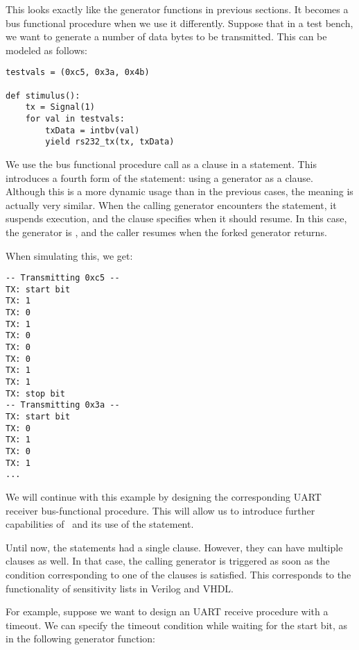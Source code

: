 This looks exactly like the generator functions in previous sections. It
becomes a bus functional procedure when we use it differently. Suppose
that in a test bench, we want to generate a number of data bytes to be
transmitted. This can be modeled as follows:


\begin{verbatim}
testvals = (0xc5, 0x3a, 0x4b)

def stimulus():
    tx = Signal(1)
    for val in testvals:
        txData = intbv(val)
        yield rs232_tx(tx, txData)

\end{verbatim}

We use the bus functional procedure call as a clause in a
 statement. This introduces a fourth form of the
 statement: using a generator as a clause. Although this is
a more dynamic usage than in the previous cases, the meaning is
actually very similar. When the calling generator 
encounters the  statement, it suspends execution, and the
clause specifies when it should resume. In this case, the generator
 is , and the caller resumes
when the forked generator returns.

When simulating this, we get:

\begin{verbatim}
-- Transmitting 0xc5 --
TX: start bit
TX: 1
TX: 0
TX: 1
TX: 0
TX: 0
TX: 0
TX: 1
TX: 1
TX: stop bit
-- Transmitting 0x3a --
TX: start bit
TX: 0
TX: 1
TX: 0
TX: 1
...

\end{verbatim}

We will continue with this example by designing the corresponding UART
receiver bus-functional procedure. This will allow us to introduce
further capabilities of \myhdl\ and its use of the 
statement. 

Until now, the  statements had a single clause. However,
they can have multiple clauses as well. In that case, the calling
generator is triggered as soon as the condition corresponding to one
of the clauses is satisfied. This corresponds to the functionality of
sensitivity lists in Verilog and VHDL.

For example, suppose we want to design an UART receive procedure with
a timeout. We can specify the timeout condition while waiting for the
start bit, as in the following generator function:

